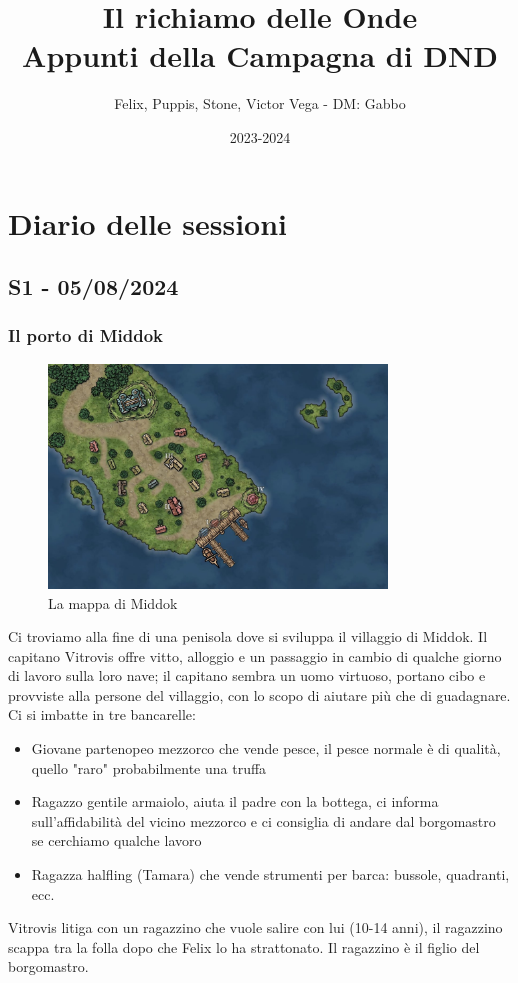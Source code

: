 \documentclass[letterpaper,twocolumn,openany, nodeprecatedcode, nomultitoc]{dndbook}
\title{Il richiamo delle Onde \\
\large Appunti della Campagna di DND}
\author{Felix, Puppis, Stone, Victor Vega - DM: Gabbo}
\date{2023-2024}
\begin{document}
\frontmatter

\maketitle

\tableofcontents


\mainmatter%

\chapter{Diario delle sessioni}


\section{S1 - 05/08/2024}
\subsection{Il porto di Middok}
\begin{figure}
\centering
\includegraphics[width=9cm]{./mappe/mappa-middok.png}
\caption{La mappa di Middok}
\label{middok}
\end{figure}


Ci troviamo alla fine di una penisola dove si sviluppa il villaggio di Middok.
Il capitano Vitrovis offre vitto, alloggio e un passaggio in cambio di qualche giorno di lavoro sulla loro nave; il capitano sembra un uomo virtuoso, portano cibo e provviste alla persone del villaggio, con lo scopo di aiutare più che di guadagnare.
Ci si imbatte in tre bancarelle:
\begin{itemize}
  \item Giovane partenopeo mezzorco che vende pesce, il pesce normale è di qualità, quello "raro" probabilmente una truffa
  \item Ragazzo gentile armaiolo, aiuta il padre con la bottega, ci informa sull'affidabilità del vicino mezzorco e ci consiglia di andare dal borgomastro se cerchiamo qualche lavoro
  \item Ragazza halfling (Tamara) che vende strumenti per barca: bussole, quadranti, ecc.
\end{itemize}
Vitrovis litiga con un ragazzino che vuole salire con lui (10-14 anni), il ragazzino scappa tra la folla dopo che Felix lo ha strattonato. Il ragazzino è il figlio del borgomastro.
\end{document}
